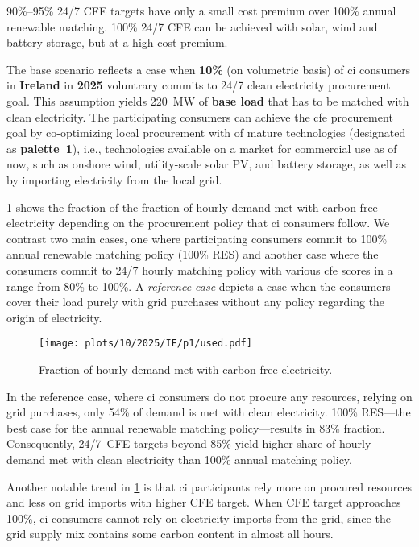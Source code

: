 \vspace{5pt}
\begin{res}
    90\%--95\% 24/7 CFE targets have only a small cost premium over 100\% annual renewable matching. 100\% 24/7 CFE can be achieved with solar, wind and battery storage, but at a high cost premium.
\end{res}


The base scenario reflects a case when \textbf{10\%} (on volumetric basis) of \gls{ci} consumers in \textbf{Ireland} in \textbf{2025} voluntrary commits to 24/7 clean electricity procurement goal.
This assumption yields 220~MW of \textbf{base load} that has to be matched with clean electricity. 
The participating consumers can achieve the \gls{cfe} procurement goal by co-optimizing local procurement with of mature technologies (designated as \textbf{palette~1}), i.e., technologies available on a market for commercial use as of now, such as onshore wind, utility-scale solar PV, and battery storage, as well as by importing electricity from the local grid.

\cref{fig:10-2025-IE-p1-used} shows the fraction of the fraction of hourly demand met with carbon-free electricity depending on the procurement policy that \gls{ci} consumers follow.
We contrast two main cases, one where participating consumers commit to 100\% annual renewable matching policy (100\% RES) and another case where the consumers commit to 24/7 hourly matching policy with various \gls{cfe} scores in a range from 80\% to 100\%. 
A \textit{reference case} depicts a case when the consumers cover their load purely with grid purchases without any policy regarding the origin of electricity.

\begin{figure}
    \centering
    \texttt{[image: plots/10/2025/IE/p1/used.pdf]}
    \caption{Fraction of hourly demand met with carbon-free electricity.}
    \label{fig:10-2025-IE-p1-used}
\end{figure}

In the reference case, where \gls{ci} consumers do not procure any resources, relying on grid purchases, only 54\% of demand is met with clean electricity.
100\% RES---the best case for the annual renewable matching policy---results in 83\% fraction. 
Consequently, 24/7~CFE targets beyond 85\% yield higher share of hourly demand met with clean electricity than 100\% annual matching policy.

Another notable trend in \cref{fig:10-2025-IE-p1-used} is that \gls{ci} participants rely more on procured resources and less on grid imports with higher CFE target.
When CFE target approaches 100\%, \gls{ci} consumers cannot rely on electricity imports from the grid, since the grid supply mix contains some carbon content in almost all hours.

